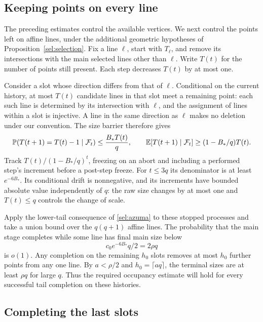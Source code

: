\subsection{Keeping points on every line}

The preceding estimates control the available vertices.  We next
control the points left on affine lines, under the additional
geometric hypotheses of Proposition~\ref{sel:selection}.
Fix a line $\ell$, start with $T_\ell$, and remove its intersections
with the main selected lines other than $\ell$.  Write $T(t)$ for
the number of points still present.  Each step decreases $T(t)$ by
at most one.

Consider a slot whose direction differs from that of $\ell$.
Conditional on the current history, at most $T(t)$ candidate lines
in that slot meet a remaining point: each such line is determined by
its intersection with $\ell$, and the assignment of lines within a
slot is injective.  A line in the same direction as $\ell$ makes no
deletion under our convention.  The size barrier therefore gives
\begin{equation}\label{sel:occupancy-drift}
 \mathbb P(T(t+1)=T(t)-1\mid\mathcal F_t)
 \le \frac{B_*T(t)}q,
 \qquad
 \mathbb E[T(t+1)\mid\mathcal F_t]\ge(1-B_*/q)T(t).
\end{equation}
Track $T(t)/(1-B_*/q)^t$, freezing on an abort and including a
performed step's increment before a post-step freeze.  For $t\le3q$
its denominator is at least $e^{-6B_*}$.  Its conditional drift
is nonnegative, and its increments have bounded absolute value
independently of $q$: the raw size changes by at most one and
$T(t)\le q$ controls the change of scale.

Apply the lower-tail consequence of \eqref{sel:azuma} to these
stopped processes and take a union bound over the $q(q+1)$ affine
lines.  The probability that the main stage completes while some
line has final main size below
\begin{equation}\label{sel:occupancy-main}
 c_0 e^{-6B_*}q/2=2\rho q
\end{equation}
is $o(1)$.
Any completion on the remaining $h_0$ slots removes at most $h_0$
further points from any one line.  By $a<\rho/2$ and
$h_0=\lceil aq\rceil$, the terminal sizes are at least $\rho q$
for large $q$.  Thus the required occupancy estimate will hold for
every successful tail completion on these histories.

\subsection{Completing the last slots}

